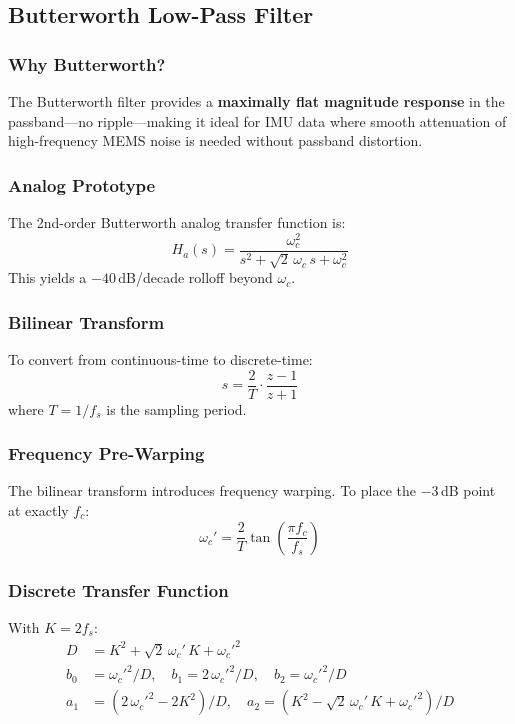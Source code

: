 \documentclass[12pt,a4paper]{article}
\begin{document}
\subsection{Butterworth Low-Pass Filter}

\subsubsection{Why Butterworth?}
The Butterworth filter provides a \textbf{maximally flat magnitude response} in the passband---no ripple---making it ideal for IMU data where smooth attenuation of high-frequency MEMS noise is needed without passband distortion.

\subsubsection{Analog Prototype}
The 2nd-order Butterworth analog transfer function is:
\begin{equation}
H_a(s) = \frac{\omega_c^2}{s^2 + \sqrt{2}\,\omega_c\,s + \omega_c^2}
\end{equation}
This yields a $-40$\,dB/decade rolloff beyond $\omega_c$.

\subsubsection{Bilinear Transform}
To convert from continuous-time to discrete-time:
\begin{equation}
s = \frac{2}{T}\cdot\frac{z-1}{z+1}
\end{equation}
where $T = 1/f_s$ is the sampling period.

\subsubsection{Frequency Pre-Warping}
The bilinear transform introduces frequency warping. To place the $-3$\,dB point at exactly $f_c$:
\begin{equation}
\omega_c' = \frac{2}{T}\tan\!\left(\frac{\pi f_c}{f_s}\right)
\end{equation}

\subsubsection{Discrete Transfer Function}
With $K = 2f_s$:
\begin{align}
D &= K^2 + \sqrt{2}\,\omega_c'\,K + {\omega_c'}^2 \\
b_0 &= {\omega_c'}^2 / D,\quad b_1 = 2\,{\omega_c'}^2 / D,\quad b_2 = {\omega_c'}^2 / D \\
a_1 &= (2\,{\omega_c'}^2 - 2K^2) / D,\quad a_2 = (K^2 - \sqrt{2}\,\omega_c'\,K + {\omega_c'}^2) / D
\end{align}
\end{document}
